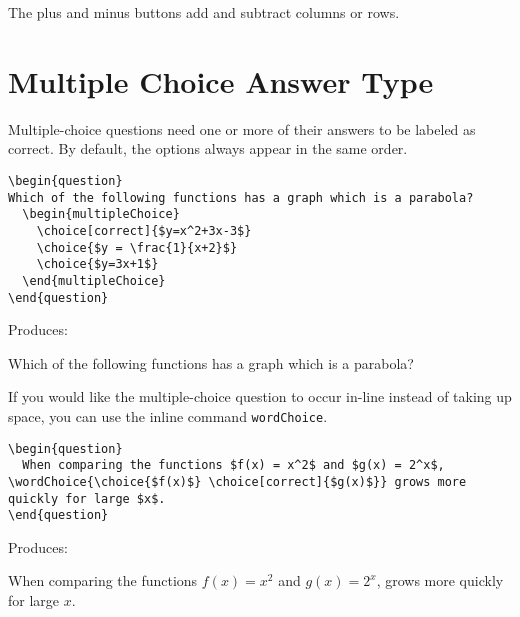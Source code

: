 \documentclass{ximera}
\begin{document}
\begin{remark}
  The plus and minus buttons add and subtract columns or rows.  
\end{remark}


\section{Multiple Choice Answer Type}

Multiple-choice questions need one or more of their answers to be labeled as correct. By default, the options always appear in the same order.

\begin{verbatim}
\begin{question}
Which of the following functions has a graph which is a parabola?
  \begin{multipleChoice}
    \choice[correct]{$y=x^2+3x-3$}
    \choice{$y = \frac{1}{x+2}$}
    \choice{$y=3x+1$}
  \end{multipleChoice}
\end{question}
\end{verbatim}

Produces:

\begin{question}
  Which of the following functions has a graph which is a parabola?
  \begin{multipleChoice}
  \end{multipleChoice}
\end{question}


If you would like the multiple-choice question to occur in-line instead of taking up space, you can use the inline command \verb!wordChoice!.
 
\begin{verbatim}
\begin{question}
  When comparing the functions $f(x) = x^2$ and $g(x) = 2^x$, \wordChoice{\choice{$f(x)$} \choice[correct]{$g(x)$}} grows more quickly for large $x$.
\end{question}
\end{verbatim}

Produces:

\begin{question}
  When comparing the functions $f(x) = x^2$ and $g(x) = 2^x$,  grows more quickly for large $x$.
\end{question}
\end{document}

